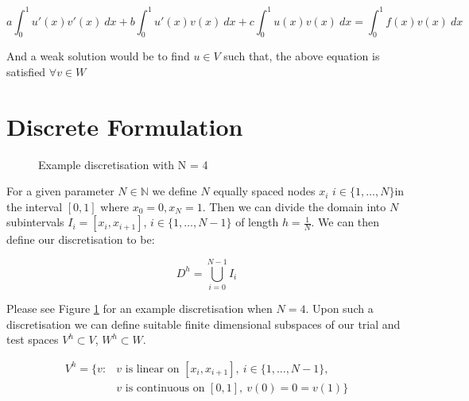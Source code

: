 \begin{equation}\label{eq:wk-oned-deterministic}
	a\int_0^1{u'(x)v'(x)\ dx} + b\int_0^1{u'(x)v(x)\ dx} + c\int_0^1{u(x)v(x)\ dx} = 
    \int_0^1{f(x)v(x)\ dx}
\end{equation}

And a weak solution would be to find $u \in V$ such that, the above equation is 
satisfied $\forall v \in W$

\section{Discrete Formulation}

\begin{figure}
\centering
{}
\caption{Example discretisation with N = 4}
\label{fig:one-d-discretisation}
\end{figure}

For a given parameter $N \in \mathbb{N}$ we define $N$ equally spaced nodes $x_i$ 
$i \in \{1, \ldots, N\} $in the interval $[0,1]$ where $x_0 = 0, x_N = 1$. Then we
can divide the domain into $N$ subintervals $ I_i = [x_i, x_{i+1}]$,
$i \in \{1,\ldots,N - 1\}$ of length $h = \frac{1}{N}$. We can then define our 
discretisation to be:

\[
	D^h = \bigcup_{i=0}^{N - 1} I_i
\]

Please see Figure \ref{fig:one-d-discretisation} for an example discretisation when $N=4$.
Upon such a discretisation we can define suitable finite dimensional subspaces of our trial and
test spaces $V^h \subset V$, $W^h \subset W$.

\begin{align*}
	V^h = \{v: &v \text{ is linear on } [x_i, x_{i+1}],\ i \in \{1, \ldots, N - 1\}, \\
               &v \text{ is continuous on } [0, 1],\ v(0) = 0 = v(1)\}
\end{align*}

